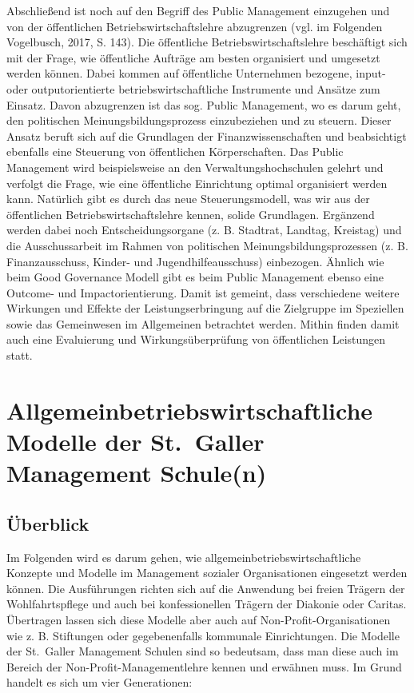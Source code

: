\documentclass[
  letterpaper,
]{book}
\begin{document}
Abschließend ist noch auf den Begriff des Public Management einzugehen
und von der öffentlichen Betriebswirtschaftslehre abzugrenzen (vgl. im
Folgenden Vogelbusch, 2017, S. 143). Die öffentliche
Betriebswirtschaftslehre beschäftigt sich mit der Frage, wie öffentliche
Aufträge am besten organisiert und umgesetzt werden können. Dabei kommen
auf öffentliche Unternehmen bezogene, input- oder outputorientierte
betriebswirtschaftliche Instrumente und Ansätze zum Einsatz. Davon
abzugrenzen ist das sog. Public Management, wo es darum geht, den
politischen Meinungsbildungsprozess einzubeziehen und zu steuern. Dieser
Ansatz beruft sich auf die Grundlagen der Finanzwissenschaften und
beabsichtigt ebenfalls eine Steuerung von öffentlichen Körperschaften.
Das Public Management wird beispielsweise an den Verwaltungshochschulen
gelehrt und verfolgt die Frage, wie eine öffentliche Einrichtung optimal
organisiert werden kann. Natürlich gibt es durch das neue
Steuerungsmodell, was wir aus der öffentlichen Betriebswirtschaftslehre
kennen, solide Grundlagen. Ergänzend werden dabei noch
Entscheidungsorgane (z. B. Stadtrat, Landtag, Kreistag) und die
Ausschussarbeit im Rahmen von politischen Meinungsbildungsprozessen (z.
B. Finanzausschuss, Kinder- und Jugendhilfeausschuss) einbezogen.
Ähnlich wie beim Good Governance Modell gibt es beim Public Management
ebenso eine Outcome- und Impactorientierung. Damit ist gemeint, dass
verschiedene weitere Wirkungen und Effekte der Leistungserbringung auf
die Zielgruppe im Speziellen sowie das Gemeinwesen im Allgemeinen
betrachtet werden. Mithin finden damit auch eine Evaluierung und
Wirkungsüberprüfung von öffentlichen Leistungen statt.

\section{Allgemeinbetriebswirtschaftliche Modelle der St.~Galler
Management
Schule(n)}\label{allgemeinbetriebswirtschaftliche-modelle-der-st-galler-management-schulen}

\subsection{Überblick}\label{berblick}

Im Folgenden wird es darum gehen, wie allgemeinbetriebswirtschaftliche
Konzepte und Modelle im Management sozialer Organisationen eingesetzt
werden können. Die Ausführungen richten sich auf die Anwendung bei
freien Trägern der Wohlfahrtspflege und auch bei konfessionellen Trägern
der Diakonie oder Caritas. Übertragen lassen sich diese Modelle aber
auch auf Non-Profit-Organisationen wie z. B. Stiftungen oder
gegebenenfalls kommunale Einrichtungen. Die Modelle der St.~Galler
Management Schulen sind so bedeutsam, dass man diese auch im Bereich der
Non-Profit-Managementlehre kennen und erwähnen muss. Im Grund handelt es
sich um vier Generationen:
\end{document}
